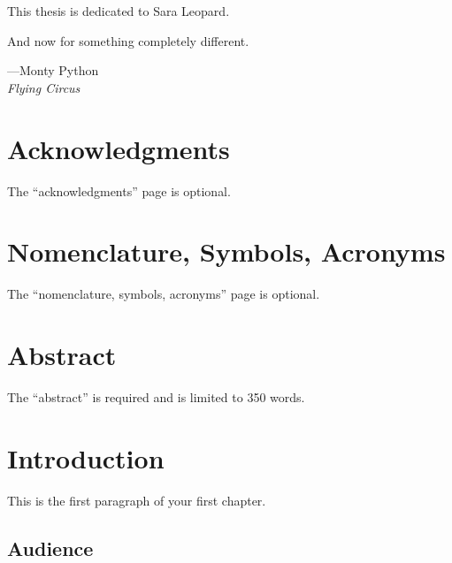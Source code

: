 \begin{centeredpage}
This thesis is dedicated to Sara Leopard.
\end{centeredpage}


\begin{centeredpage}
\epigraph{And now for something completely different.}{---Monty Python\\
\textit{Flying Circus}}
\end{centeredpage}


\chapter{Acknowledgments}

The ``acknowledgments'' page is optional.


\tableofcontents


\listoftables


\listoffigures


\chapter{Nomenclature, Symbols, Acronyms}

The ``nomenclature, symbols, acronyms'' page is optional.


\chapter{Abstract}

The ``abstract'' is required and is limited to 350 words.


\mainmatter


\chapter{Introduction}
\label{chap:intro}

This is the first paragraph of your first chapter.

\section{Audience}

